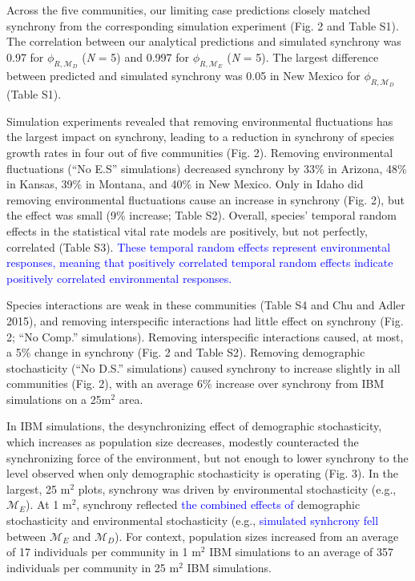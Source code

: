 \documentclass[11pt,]{article}
\begin{document}
Across the five communities, our limiting case predictions closely
matched synchrony from the corresponding simulation experiment (Fig. 2
and Table S1). The correlation between our analytical predictions and
simulated synchrony was 0.97 for \(\phi_{R,\mathcal{M}_D}\) (\emph{N} =
5) and 0.997 for \(\phi_{R,\mathcal{M}_E}\) (\emph{N} = 5). The largest
difference between predicted and simulated synchrony was 0.05 in New
Mexico for \(\phi_{R,\mathcal{M}_D}\) (Table S1).

Simulation experiments revealed that removing environmental fluctuations
has the largest impact on synchrony, leading to a reduction in synchrony
of species growth rates in four out of five communities (Fig. 2).
Removing environmental fluctuations (``No E.S'' simulations) decreased
synchrony by 33\% in Arizona, 48\% in Kansas, 39\% in Montana, and 40\%
in New Mexico. Only in Idaho did removing environmental fluctuations
cause an increase in synchrony (Fig. 2), but the effect was small (9\%
increase; Table S2). Overall, species' temporal random effects in the
statistical vital rate models are positively, but not perfectly,
correlated (Table S3).
\textcolor{blue}{These temporal random effects represent environmental responses, meaning that positively correlated temporal random effects indicate positively correlated environmental responses.}

Species interactions are weak in these communities (Table S4 and Chu and
Adler 2015), and removing interspecific interactions had little effect
on synchrony (Fig. 2; ``No Comp.'' simulations). Removing interspecific
interactions caused, at most, a 5\% change in synchrony (Fig. 2 and
Table S2). Removing demographic stochasticity (``No D.S.'' simulations)
caused synchrony to increase slightly in all communities (Fig. 2), with
an average 6\% increase over synchrony from IBM simulations on a
25\(\text{m}^2\) area.

In IBM simulations, the desynchronizing effect of demographic
stochasticity, which increases as population size decreases, modestly
counteracted the synchronizing force of the environment, but not enough
to lower synchrony to the level observed when only demographic
stochasticity is operating (Fig. 3). In the largest, 25 \(\text{m}^2\)
plots, synchrony was driven by environmental stochasticity (e.g.,
\(\mathcal{M}_E\)). At 1 \(\text{m}^2\), synchrony reflected
\textcolor{blue}{the combined effects of} demographic stochasticity and
environmental stochasticity (e.g.,
\textcolor{blue}{simulated synhcrony fell} between \(\mathcal{M}_E\) and
\(\mathcal{M}_D\)). For context, population sizes increased from an
average of 17 individuals per community in 1 \(\text{m}^2\) IBM
simulations to an average of 357 individuals per community in 25
\(\text{m}^2\) IBM simulations.
\end{document}
